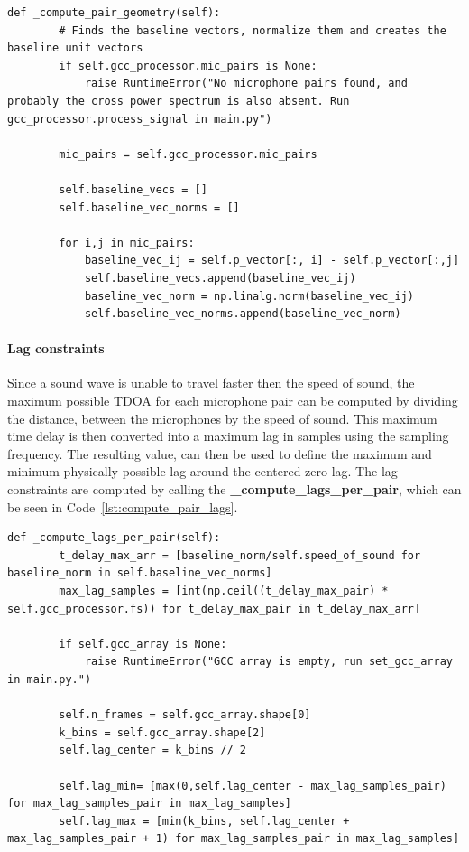     \begin{lstlisting}[style=pythonstyle, caption={Function used to compute the pair geometry.}, label={lst:pair_geometry}]
    def _compute_pair_geometry(self):
        # Finds the baseline vectors, normalize them and creates the baseline unit vectors
        if self.gcc_processor.mic_pairs is None:
            raise RuntimeError("No microphone pairs found, and probably the cross power spectrum is also absent. Run gcc_processor.process_signal in main.py")

        mic_pairs = self.gcc_processor.mic_pairs
        
        self.baseline_vecs = []
        self.baseline_vec_norms = []
        
        for i,j in mic_pairs:
            baseline_vec_ij = self.p_vector[:, i] - self.p_vector[:,j]
            self.baseline_vecs.append(baseline_vec_ij)
            baseline_vec_norm = np.linalg.norm(baseline_vec_ij)
            self.baseline_vec_norms.append(baseline_vec_norm)
    \end{lstlisting}

    \paragraph{Lag constraints}
    Since a sound wave is unable to travel faster then the speed of sound, the maximum possible TDOA for each microphone pair can be computed by dividing the distance, between the microphones by the speed of sound. This maximum time delay is then converted into a maximum lag in samples using the sampling frequency. The resulting value, can then be used to define the maximum and minimum physically possible lag around the centered zero lag. The lag constraints are computed by calling the \textbf{\_compute\_lags\_per\_pair}, which can be seen in Code~\ref{lst:compute_pair_lags}.\\

    \begin{lstlisting}[style=pythonstyle, caption={Function used to compute the pair lags.}, label={lst:compute_pair_lags}]
    def _compute_lags_per_pair(self):
        t_delay_max_arr = [baseline_norm/self.speed_of_sound for baseline_norm in self.baseline_vec_norms]
        max_lag_samples = [int(np.ceil((t_delay_max_pair) * self.gcc_processor.fs)) for t_delay_max_pair in t_delay_max_arr] 
        
        if self.gcc_array is None:
            raise RuntimeError("GCC array is empty, run set_gcc_array in main.py.")
        
        self.n_frames = self.gcc_array.shape[0]
        k_bins = self.gcc_array.shape[2]
        self.lag_center = k_bins // 2

        self.lag_min= [max(0,self.lag_center - max_lag_samples_pair) for max_lag_samples_pair in max_lag_samples]
        self.lag_max = [min(k_bins, self.lag_center + max_lag_samples_pair + 1) for max_lag_samples_pair in max_lag_samples]
    \end{lstlisting}
    \newpage


